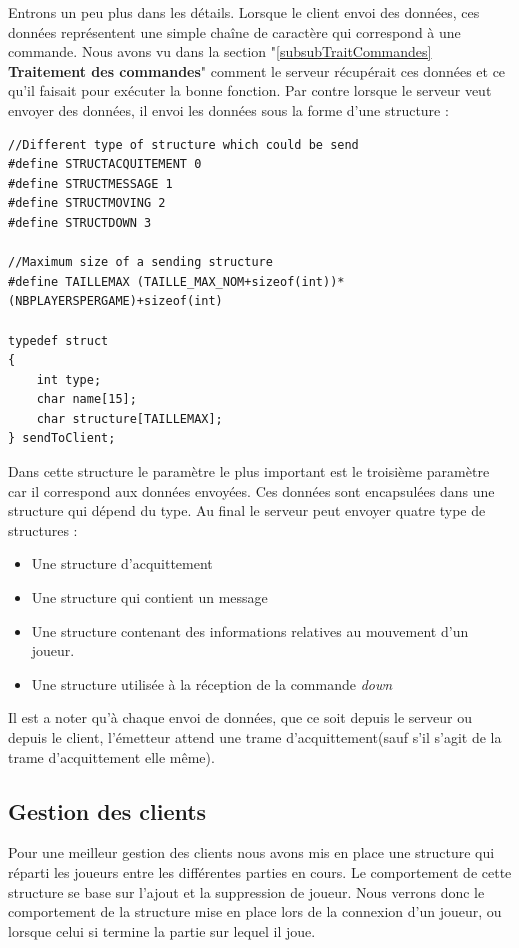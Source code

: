 \documentclass[a4paper,10pt]{article}
\begin{document}
	Entrons un peu plus dans les détails. Lorsque le client envoi des données, ces données représentent une simple chaîne de caractère qui correspond à une
commande. Nous avons vu dans la section "\ref{subsubTraitCommandes} \textbf{Traitement des commandes}" comment le serveur récupérait ces données et ce qu'il
faisait pour exécuter la bonne fonction. Par contre lorsque le serveur veut envoyer des données, il envoi les données sous la forme d'une structure :
\begin{lstlisting}
//Different type of structure which could be send
#define STRUCTACQUITEMENT 0
#define STRUCTMESSAGE 1
#define STRUCTMOVING 2
#define STRUCTDOWN 3

//Maximum size of a sending structure
#define TAILLEMAX (TAILLE_MAX_NOM+sizeof(int))*(NBPLAYERSPERGAME)+sizeof(int)

typedef struct
{
    int type;
    char name[15];
    char structure[TAILLEMAX];
} sendToClient;
\end{lstlisting}

	Dans cette structure le paramètre le plus important est le troisième paramètre car il correspond aux données envoyées. Ces données sont encapsulées dans une
structure qui dépend du type. Au final le serveur peut envoyer quatre type de structures :
	\begin{itemize}
		\item Une structure d’acquittement
		\item Une structure qui contient un message
		\item Une structure contenant des informations relatives au mouvement d'un joueur.
		\item Une structure utilisée à la réception de la commande \emph{down}
	\end{itemize}

	Il est a noter qu'à chaque envoi de données, que ce soit depuis le serveur ou depuis le client, l’émetteur attend une trame d'acquittement(sauf s'il
s'agit de la trame d'acquittement elle même).



	\subsection{Gestion des clients}
	\label{subGestionClient}

	 Pour une meilleur gestion des clients nous avons mis en place une structure qui réparti les joueurs entre les différentes parties en cours.
	 Le comportement de cette structure se base sur l'ajout et la suppression de joueur. Nous verrons donc le comportement de la structure mise en place lors
de la connexion d'un joueur, ou lorsque celui si termine la partie sur lequel il joue.
\end{document}
